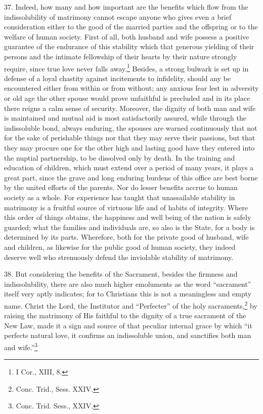 \documentclass[12pt,a4paper]{book}
\begin{document}
37. Indeed, how many and how important are the benefits which flow from the indissolubility of matrimony cannot escape anyone who gives even a brief consideration either to the good of the married parties and the offspring or to the welfare of human society. First of all, both husband and wife possess a positive guarantee of the endurance of this stability which that generous yielding of their persons and the intimate fellowship of their hearts by their nature strongly require, since true love never falls away.\footnote{I Cor., XIII, 8.} Besides, a strong bulwark is set up in defense of a loyal chastity against incitements to infidelity, should any be encountered either from within or from without; any anxious fear lest in adversity or old age the other spouse would prove unfaithful is precluded and in its place there reigns a calm sense of security. Moreover, the dignity of both man and wife is maintained and mutual aid is most satisfactorily assured, while through the indissoluble bond, always enduring, the spouses are warned continuously that not for the sake of perishable things nor that they may serve their passions, but that they may procure one for the other high and lasting good have they entered into the nuptial partnership, to be dissolved only by death. In the training and education of children, which must extend over a period of many years, it plays a great part, since the grave and long enduring burdens of this office are best borne by the united efforts of the parents. Nor do lesser benefits accrue to human society as a whole. For experience has taught that unassailable stability in matrimony is a fruitful source of virtuous life and of habits of integrity. Where this order of things obtains, the happiness and well being of the nation is safely guarded; what the families and individuals are, so also is the State, for a body is determined by its parts. Wherefore, both for the private good of husband, wife and children, as likewise for the public good of human society, they indeed deserve well who strenuously defend the inviolable stability of matrimony.

38. But considering the benefits of the Sacrament, besides the firmness and indissolubility, there are also much higher emoluments as the word ``sacrament'' itself very aptly indicates; for to Christians this is not a meaningless and empty name. Christ the Lord, the Institutor and ``Perfecter'' of the holy sacraments,\footnote{Conc. Trid., Sess. XXIV.} by raising the matrimony of His faithful to the dignity of a true sacrament of the New Law, made it a sign and source of that peculiar internal grace by which ``it perfects natural love, it confirms an indissoluble union, and sanctifies both man and wife.''\footnote{Conc. Trid. Sess., XXIV.}
\end{document}
